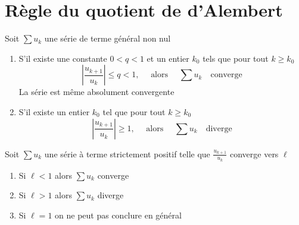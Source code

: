 \section{Règle du quotient de d'Alembert}

\begin{frame}

\begin{theoreme}
\pause
Soit $\sum u_k$ une série de terme général non nul
\begin{enumerate}
\item\pause S'il existe une constante $0 < q < 1$ et un entier $k_0$ tels que pour tout
$k \ge k_0$
$$
\left|\frac{u_{k+1}}{u_k}\right| \le q <1,\quad \text{ alors }\quad\sum u_k\quad \text{converge}
$$
\pause
La série est même absolument convergente
\item\pause S'il existe un entier $k_0$ tel que pour tout $k \ge k_0$
$$
\left|\frac{u_{k+1}}{u_k}\right| \ge 1,\quad \text{ alors }\quad\sum u_k \quad\text{diverge}
$$
\end{enumerate}
\end{theoreme}
\end{frame}

\begin{frame}

\begin{corollaire}
\pause
Soit $\sum u_k$ une série à terme strictement positif telle que 
$\frac{u_{k+1}}{u_k}$ converge vers $\ell$
\medskip
\begin{enumerate}
\item\pause Si $\ell<1$ alors $\sum u_k$ converge
\medskip
\item\pause Si $\ell>1$ alors $\sum u_k$ diverge
\medskip
\item\pause Si $\ell=1$ on ne peut pas conclure en général
\end{enumerate}
\end{corollaire}

\end{frame}

